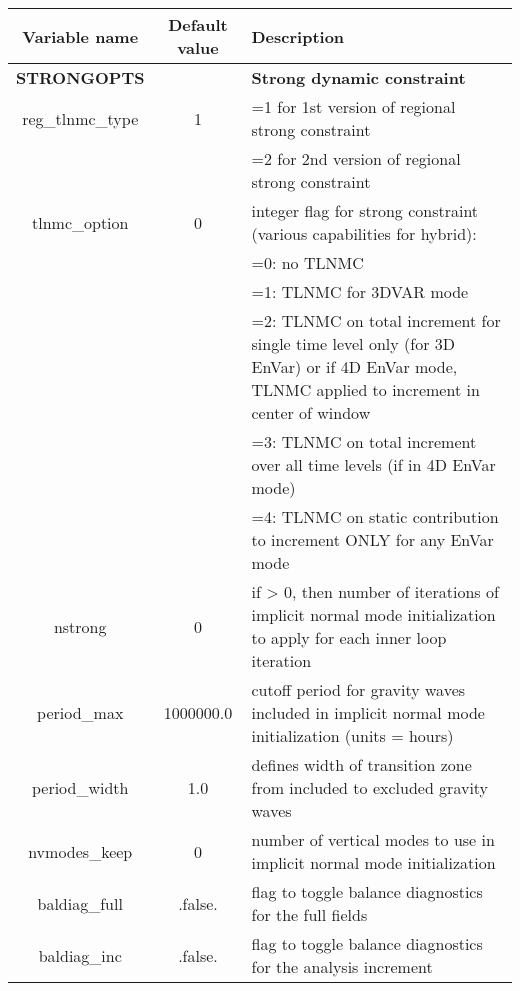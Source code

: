 \begin{table}[h]
 \footnotesize
 \center
 \begin{tabular}{| c | c | p{9cm} |}
 \hline
 Variable name & Default value & Description \\
 \hline
 \textbf{STRONGOPTS} &     & \textbf{Strong dynamic constraint} \\
 \hline
 reg\_tlnmc\_type & 1 & =1 for 1st version of regional strong constraint \\
                    &   &   =2 for 2nd version of regional strong constraint \\
 \hline
 tlnmc\_option & 0 & integer flag for strong constraint (various capabilities for hybrid): \\
               &  &  =0: no TLNMC \\
               &  &  =1: TLNMC for 3DVAR mode \\
               &  &  =2: TLNMC on total increment for single time level only (for 3D EnVar) or if 4D EnVar mode, TLNMC applied to increment in center of window \\
               &  &  =3: TLNMC on total increment over all time levels (if in 4D EnVar mode) \\
               &  &  =4: TLNMC on static contribution to increment ONLY for any EnVar mode \\
  \hline
  nstrong & 0 & if > 0, then number of iterations of implicit normal mode initialization to apply for each inner loop iteration \\
  \hline
  period\_max & 1000000.0 & cutoff period for gravity waves included in implicit normal mode initialization (units = hours) \\
  \hline
  period\_width & 1.0 & defines width of transition zone from included to excluded gravity waves \\
  \hline
  nvmodes\_keep & 0 & number of vertical modes to use in implicit normal mode initialization \\
  \hline
  baldiag\_full & .false. & flag to toggle balance diagnostics for the full fields \\
  \hline
  baldiag\_inc & .false. & flag to toggle balance diagnostics for the analysis increment \\
  \hline
 \end{tabular}
\end{table}


